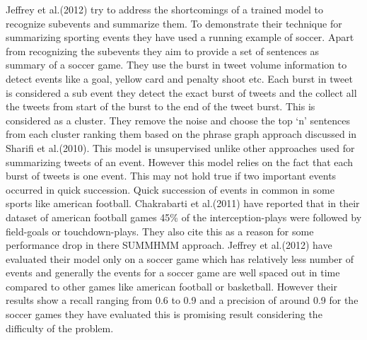 Jeffrey et al.(2012) try to address the shortcomings of a trained model to recognize subevents and summarize them. To demonstrate their technique for summarizing sporting events they have used a running example of soccer. Apart from recognizing the subevents they aim to provide a set of sentences as summary of a soccer game. They use the burst in tweet volume information to detect  events like a goal, yellow card and penalty shoot etc. Each burst in tweet is considered a sub event they detect the exact burst of tweets and the collect all the tweets from start of the burst to the end of the tweet burst. This is considered as a cluster. They remove the noise and choose the top ‘n’ sentences from each cluster ranking them based on the phrase graph approach discussed in Sharifi et al.(2010). This model is unsupervised unlike other approaches used for summarizing tweets of an event. However this model relies on the fact that each burst of tweets is one event. This may not hold true if two important events occurred in quick succession. Quick succession of events in common in some sports like american football. Chakrabarti et al.(2011) have reported that in their dataset of american football games 45\% of the interception-plays were followed by field-goals or touchdown-plays. They also cite this as a reason for some performance drop in there SUMMHMM approach. Jeffrey et al.(2012)  have evaluated their model only on a soccer game which has relatively less number of events and generally the events for a soccer game are well spaced out in time compared to other games like american football or basketball. However their results show a recall ranging from 0.6 to 0.9 and a precision of around 0.9 for the soccer games they have evaluated this is promising result considering the difficulty of the problem.


